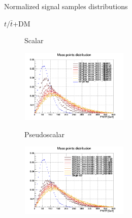 \documentclass[8pt]{beamer}
\begin{document}
\begin{frame}{Normalized signal samples distributions}
\justifying
\begin{block}{\centering $t/\bar t$+DM}\end{block} \vspace{-10pt}
\begin{figure}[htbp]
\centering
\begin{minipage}[b]{.49\textwidth}
\vspace{-5pt}
\begin{block}{\centering Scalar}\end{block}
\begin{center}
\includegraphics[width=5.2cm, height=3.5cm]{figs/singleTopScalarMETNorm.png}
\end{center}
\end{minipage}
\begin{minipage}[b]{.02\textwidth}\end{minipage}
\begin{minipage}[b]{.49\textwidth}
\vspace{-5pt}
\begin{block}{\centering Pseudoscalar}\end{block}
\begin{center}
\includegraphics[width=5.2cm, height=3.5cm]{figs/singleTopPseudoMETNorm.png}
\end{center}
\end{minipage}
\end{figure} \vfill


\end{frame}
\end{document}
